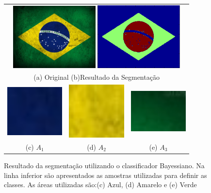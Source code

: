 \documentclass[ 
	article,			%
	11pt,				%
	oneside,			%
	a4paper,			%
	english,			%
	brazil,				%
	]{abntex2}
\begin{document}
\begin{figure}
	\centering
	\begin{tabular}{ccc}
	\multicolumn{3}{c}{
	  \includegraphics[width=45mm]{matlab/figura/gauss/segmentacao/brasil.jpg} 
	  \includegraphics[width=45mm]{matlab/figura/gauss/segmentacao/brasilSeg.png}
	  }\\ 
	\multicolumn{3}{c}{
	 \hspace{1cm} (a) Original \hspace{15mm} (b)Resultado da Segmentação
	  }\\ 	  
	 \includegraphics[width=30mm]{matlab/figura/gauss/segmentacao/bc1.png}&   
	 \includegraphics[width=30mm]{matlab/figura/gauss/segmentacao/bc2.png}& 
	 \includegraphics[width=30mm]{matlab/figura/gauss/segmentacao/bc3.png} \\
	(c) $A_1$ & (d) $A_2$ & (e) $A_3$\\[6pt] 

	\end{tabular}
	\caption{Resultado da segmentação utilizando o classificador Bayessiano. Na
	linha inferior são apresentados as amostras utilizadas para definir as
	classes. As áreas utilizadas são:(c) Azul, (d) Amarelo e (e) Verde}
	\label{fig:resultBandSegParadise}
\end{figure}
\end{document}
